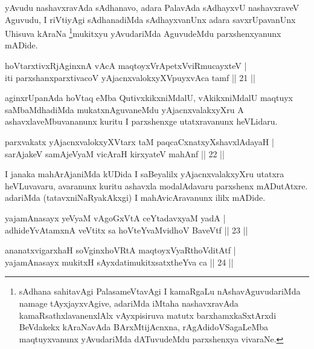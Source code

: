 \begin{artha}
yAvudu nashavxravAda sAdhanavo, adara PalavAda sAdhayxvU nashavxraveV Aguvudu, I riVtiyAgi sAdhanadiMda sAdhayxvanUnx adara savxrUpavanUnx Uhisuva kAraNa \footnote[1]{sAdhana sahitavAgi PalasameVtavAgi I kamaRgaLu nAshavAguvudariMda namage tAyxjayxvAgive, adariMda iMtaha nashavxravAda kamaRsathxlavanenxlAlx vAyxpisiruva matutx barxhamxkaSxtArxdi BeVdakekx kAraNavAda BArxMtijAcnxna, rAgAdidoVSagaLeMba maqtuyxvanunx yAvudariMda dATuvudeMdu parxshenxya vivaraNe.}mukitxyu yAvudariMda AguvudeMdu parxshenxyanunx mADide.
\end{artha}


\begin{shl}
hoVtarxtivxRjA\s ginxnA vAcA maqtoyxVrApetxVviRmucayxteV |\\
iti parxshanxparxtivacoV yAjacnxvalokxyXV\s puyxvAca tamf \hfill || 21 ||
\end{shl}

\begin{artha}
aginxrUpanAda hoVtaq eMba QutivxkikxniMdalU, vAkikxniMdalU maqtuyx saMbaMdhadiMda mukatxnAguvaneMdu yAjacnxvalakxyXru A ashavxlaveMbuvananunx kuritu I parxshenxge utatxravanunx heVLidaru.
\end{artha}

\begin{shl}
parxvakatx yAjacnxvalokxyXV\s tarx taM paqcaCxnatxyXshavxlAdayaH |\\
sarAjakeV samAjeV\s yaM vicAraH kirxyateV mahAnf \hfill || 22 ||
\end{shl}

\begin{artha}
I janaka mahArAjaniMda kUDida I saBeyalilx yAjacnxvalakxyXru utatxra heVLuvavaru, avaranunx kuritu ashavxla modalAdavaru parxshenx mADutAtxre. adariMda (tatavxniNaRyakAkxgi) I mahAvicAravanunx ililx mADide.
\end{artha}


\begin{shl}
yajamAnasayx yeVyaM vAgoGxVtA ceYtadavxyaM yadA |\\
adhideYvAtamxnA veVtitx sa hoVteYvaMvidhoV BaveVtf \hfill || 23 ||
\end{shl}

\begin{shl}
ananatxvigarxhaH soV\s ginxhoVRtA maqtoyxVyaRthoVditAtf |\\
yajamAnasayx mukitxH sAyxdatimukitxsatxtheYva ca \hfill || 24 ||
\end{shl}

